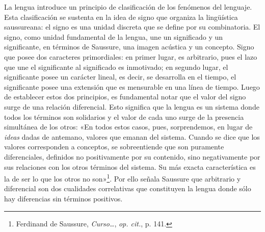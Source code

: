 La lengua introduce un principio de clasificación de los fenómenos del lenguaje. Esta clasificación se sustenta en la idea de signo que organiza la lingüística saussureana: el signo es una unidad discreta que se define por su combinatoria. El signo, como unidad fundamental de la lengua, une un significado y un significante, en términos de Saussure, una imagen acústica y un concepto. Signo que posee dos caracteres primordiales: en primer lugar, es arbitrario, pues el lazo que une el significante al significado es inmotivado; en segundo lugar, el significante posee un carácter lineal, es decir, se desarrolla en el tiempo, el significante posee una extensión que es mensurable en una línea de tiempo. Luego de establecer estos dos principios, es fundamental notar que el valor del signo surge de una relación diferencial. Esto significa que la lengua es un sistema donde todos los términos son solidarios y el valor de cada uno surge de la presencia simultánea de los otros: «En todos estos casos, pues, sorprendemos, en lugar de \emph{ideas} dadas de antemano, valores que emanan del sistema. Cuando se dice que los valores corresponden a conceptos, se sobreentiende que son puramente diferenciales, definidos no positivamente por su contenido, sino negativamente por sus relaciones con los otros términos del sistema. Su más exacta característica es la de ser lo que los otros no son»\footnote{Ferdinand de Saussure, \emph{Curso\ldots{}}, \emph{op. cit.}, p. 141.}. Por ello señala Saussure que arbitrario y diferencial son dos cualidades correlativas que constituyen la lengua donde sólo hay diferencias sin términos positivos.

